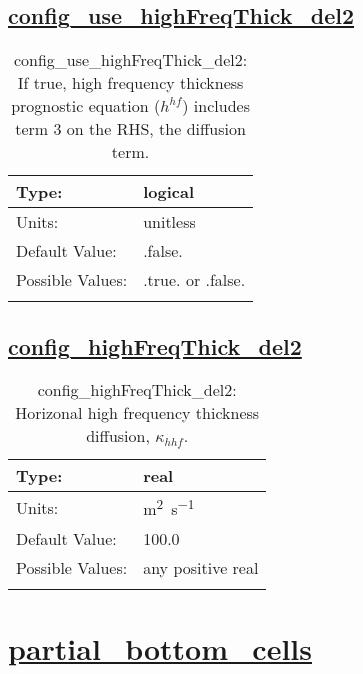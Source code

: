 \subsection[config\_use\_highFreqThick\_del2]{\hyperref[sec:nm_tab_ALE_frequency_filtered_thickness]{config\_use\_highFreqThick\_del2}}
\label{subsec:nm_sec_config_use_highFreqThick_del2}
\begin{center}
\begin{longtable}{| p{2.0in} || p{4.0in} |}
    \hline
    Type: & logical \\
    \hline
    Units: & \si{unitless} \\
    \hline
    Default Value: & .false. \\
    \hline
    Possible Values: & .true. or .false. \\
    \hline
    \caption{config\_use\_highFreqThick\_del2: If true, high frequency thickness prognostic equation ($h^{hf}$) includes term 3 on the RHS, the diffusion term.}
\end{longtable}
\end{center}
\subsection[config\_highFreqThick\_del2]{\hyperref[sec:nm_tab_ALE_frequency_filtered_thickness]{config\_highFreqThick\_del2}}
\label{subsec:nm_sec_config_highFreqThick_del2}
\begin{center}
\begin{longtable}{| p{2.0in} || p{4.0in} |}
    \hline
    Type: & real \\
    \hline
    Units: & \si{m^2.s^{-1}} \\
    \hline
    Default Value: & 100.0 \\
    \hline
    Possible Values: & any positive real \\
    \hline
    \caption{config\_highFreqThick\_del2: Horizonal high frequency thickness diffusion, $\kappa_{hhf}$.}
\end{longtable}
\end{center}
\section[partial\_bottom\_cells]{\hyperref[sec:nm_tab_partial_bottom_cells]{partial\_bottom\_cells}}
\label{sec:nm_sec_partial_bottom_cells}

